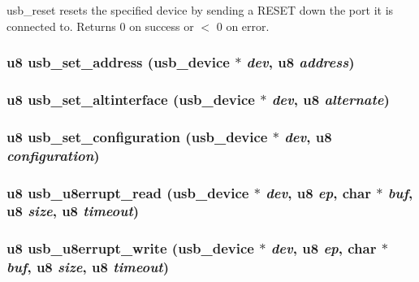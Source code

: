 usb\_\-reset resets the specified device by sending a RESET down the port it is connected to. Returns 0 on success or $<$ 0 on error. 
\subsubsection{\setlength{\rightskip}{0pt plus 5cm}u8 usb\_\-set\_\-address ({\bf usb\_\-device} $\ast$ {\em dev}, u8 {\em address})}\label{usb_8h_5a09d4be5e45fe503236041ada40405d}


\subsubsection{\setlength{\rightskip}{0pt plus 5cm}u8 usb\_\-set\_\-altinterface ({\bf usb\_\-device} $\ast$ {\em dev}, u8 {\em alternate})}\label{usb_8h_f61ea8d82c09b7bc9a7d5944ebe03c1c}


\subsubsection{\setlength{\rightskip}{0pt plus 5cm}u8 usb\_\-set\_\-configuration ({\bf usb\_\-device} $\ast$ {\em dev}, u8 {\em configuration})}\label{usb_8h_0d65fa2357fef7e70f480e6b479975cf}


\subsubsection{\setlength{\rightskip}{0pt plus 5cm}u8 usb\_\-u8errupt\_\-read ({\bf usb\_\-device} $\ast$ {\em dev}, u8 {\em ep}, char $\ast$ {\em buf}, u8 {\em size}, u8 {\em timeout})}\label{usb_8h_ed39685b228fc5b4192d0ff6b3acc12a}


\subsubsection{\setlength{\rightskip}{0pt plus 5cm}u8 usb\_\-u8errupt\_\-write ({\bf usb\_\-device} $\ast$ {\em dev}, u8 {\em ep}, char $\ast$ {\em buf}, u8 {\em size}, u8 {\em timeout})}\label{usb_8h_748c402a0d9400622abff015492e7c6b}


